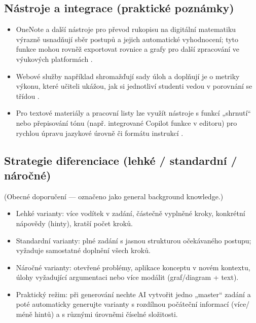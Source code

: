 \subsection*{Nástroje a integrace (praktické poznámky)}
\begin{itemize}
  \item OneNote a další nástroje pro převod rukopisu na digitální matematiku výrazně usnadňují sběr postupů a jejich automatické vyhodnocení; tyto funkce mohou rovněž exportovat rovnice a grafy pro další zpracování ve výukových platformách \cite{kb_ai_101_tipu_pdf_04e4a115_page_8_1}.
  \item Webové služby například shromažďují sady úloh a doplňují je o metriky výkonu, které učiteli ukážou, jak si jednotliví studenti vedou v porovnání se třídou \cite{kb_ai_101_tipu_pdf_04e4a115_page_8_1}.
  \item Pro textové materiály a pracovní listy lze využít nástroje s funkcí „shrnutí“ nebo přepisování tónu (např. integrované Copilot funkce v editoru) pro rychlou úpravu jazykové úrovně či formátu instrukcí \cite{kb_ai_101_tipu_pdf_04e4a115_page_14_1}.
\end{itemize}

\subsection*{Strategie diferenciace (lehké / standardní / náročné)}
(Obecné doporučení — označeno jako general background knowledge.)
\begin{itemize}
  \item Lehké varianty: více vodítek v zadání, částečně vyplněné kroky, konkrétní nápovědy (hinty), kratší počet kroků.
  \item Standardní varianty: plné zadání s jasnou strukturou očekávaného postupu; vyžaduje samostatné doplnění všech kroků.
  \item Náročné varianty: otevřené problémy, aplikace konceptu v novém kontextu, úlohy vyžadující argumentaci nebo více mo­dálit (graf/diagram + text).
  \item Praktický režim: při generování nechte AI vytvořit jedno „master“ zadání a poté automaticky generujte varianty s rozdílnou počáteční informací (více/ méně hintů) a s různými úrovněmi číselné složitosti.
\end{itemize}

